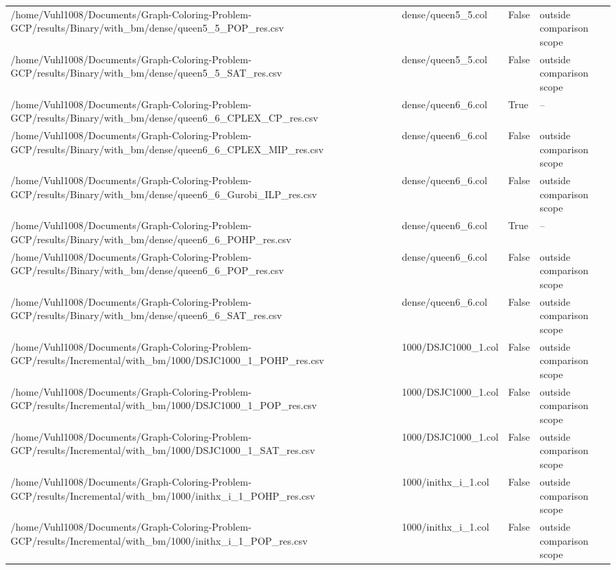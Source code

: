 \begin{table}[htbp]
\begin{tabular}{llll}
/home/Vuhl1008/Documents/Graph-Coloring-Problem-GCP/results/Binary/with\_bm/dense/queen5\_5\_POP\_res.csv & dense/queen5\_5.col & False & outside comparison scope \\
/home/Vuhl1008/Documents/Graph-Coloring-Problem-GCP/results/Binary/with\_bm/dense/queen5\_5\_SAT\_res.csv & dense/queen5\_5.col & False & outside comparison scope \\
/home/Vuhl1008/Documents/Graph-Coloring-Problem-GCP/results/Binary/with\_bm/dense/queen6\_6\_CPLEX\_CP\_res.csv & dense/queen6\_6.col & True & -- \\
/home/Vuhl1008/Documents/Graph-Coloring-Problem-GCP/results/Binary/with\_bm/dense/queen6\_6\_CPLEX\_MIP\_res.csv & dense/queen6\_6.col & False & outside comparison scope \\
/home/Vuhl1008/Documents/Graph-Coloring-Problem-GCP/results/Binary/with\_bm/dense/queen6\_6\_Gurobi\_ILP\_res.csv & dense/queen6\_6.col & False & outside comparison scope \\
/home/Vuhl1008/Documents/Graph-Coloring-Problem-GCP/results/Binary/with\_bm/dense/queen6\_6\_POHP\_res.csv & dense/queen6\_6.col & True & -- \\
/home/Vuhl1008/Documents/Graph-Coloring-Problem-GCP/results/Binary/with\_bm/dense/queen6\_6\_POP\_res.csv & dense/queen6\_6.col & False & outside comparison scope \\
/home/Vuhl1008/Documents/Graph-Coloring-Problem-GCP/results/Binary/with\_bm/dense/queen6\_6\_SAT\_res.csv & dense/queen6\_6.col & False & outside comparison scope \\
/home/Vuhl1008/Documents/Graph-Coloring-Problem-GCP/results/Incremental/with\_bm/1000/DSJC1000\_1\_POHP\_res.csv & 1000/DSJC1000\_1.col & False & outside comparison scope \\
/home/Vuhl1008/Documents/Graph-Coloring-Problem-GCP/results/Incremental/with\_bm/1000/DSJC1000\_1\_POP\_res.csv & 1000/DSJC1000\_1.col & False & outside comparison scope \\
/home/Vuhl1008/Documents/Graph-Coloring-Problem-GCP/results/Incremental/with\_bm/1000/DSJC1000\_1\_SAT\_res.csv & 1000/DSJC1000\_1.col & False & outside comparison scope \\
/home/Vuhl1008/Documents/Graph-Coloring-Problem-GCP/results/Incremental/with\_bm/1000/inithx\_i\_1\_POHP\_res.csv & 1000/inithx\_i\_1.col & False & outside comparison scope \\
/home/Vuhl1008/Documents/Graph-Coloring-Problem-GCP/results/Incremental/with\_bm/1000/inithx\_i\_1\_POP\_res.csv & 1000/inithx\_i\_1.col & False & outside comparison scope \\

\end{tabular}
\end{table}
